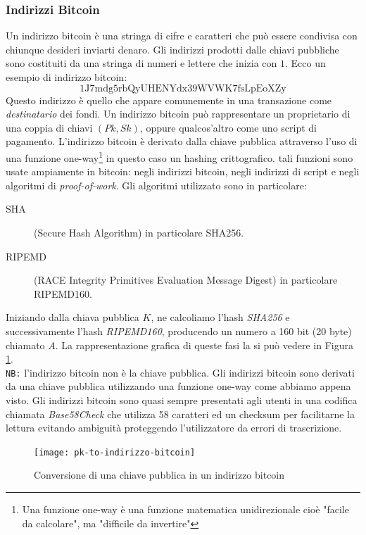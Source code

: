 \subsubsection{Indirizzi Bitcoin}
Un indirizzo bitcoin è una stringa di cifre e caratteri che può essere condivisa con chiunque desideri inviarti denaro. Gli indirizzi prodotti dalle chiavi pubbliche sono costituiti da una stringa di numeri e lettere che inizia con $1$. Ecco un esempio di indirizzo bitcoin:
\[ \text{1J7mdg5rbQyUHENYdx39WVWK7fsLpEoXZy} \]
Questo indirizzo è quello che appare comunemente in una transazione come \textit{destinatario} dei fondi. Un indirizzo bitcoin può rappresentare un proprietario di una coppia di chiavi $(Pk,Sk)$, oppure qualcos'altro come uno script di pagamento. 
L'indirizzo bitcoin è derivato dalla chiave pubblica attraverso l'uso di una funzione one-way\footnote{Una funzione one-way è una funzione matematica unidirezionale cioè "facile da calcolare", ma "difficile da invertire"} in questo caso un hashing crittografico. tali funzioni sono usate ampiamente in bitcoin: negli indirizzi bitcoin, negli indirizzi di script e negli algoritmi di \textit{proof-of-work}. Gli algoritmi utilizzato sono in particolare:
\begin{description}
	\item[SHA] (Secure Hash Algorithm) in particolare SHA256.
	\item[RIPEMD] (RACE Integrity Primitives Evaluation Message Digest) in particolare RIPEMD160.
\end{description}
Iniziando dalla chiava pubblica $K$, ne calcoliamo l'hash \textit{SHA256} e successivamente l'hash \textit{RIPEMD160}, producendo un numero a 160 bit (20 byte) chiamato $A$. La rappresentazione grafica di queste fasi la si può vedere in Figura \ref{fig:pk-to-indirizzo-bitcoin}.\\
\texttt{NB:} l'indirizzo bitcoin non è la chiave pubblica. Gli indirizzi bitcoin sono derivati da una chiave pubblica utilizzando una funzione one-way come abbiamo appena visto. Gli indirizzi bitcoin sono quasi sempre presentati agli utenti in una codifica chiamata \textit{Base58Check} che utilizza 58 caratteri ed un checksum per facilitarne la lettura evitando ambiguità proteggendo l'utilizzatore da errori di trascrizione.
\begin{figure}
	\centering 
	\texttt{[image: pk-to-indirizzo-bitcoin]} 
	\caption[Da chiave pubblica a indirizzo bitcoin]{Conversione di una chiave pubblica in un indirizzo bitcoin}
	\label{fig:pk-to-indirizzo-bitcoin} 
\end{figure}

